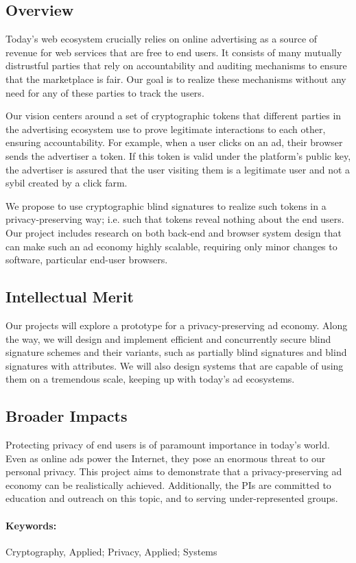 \label{sec:summary}

\subsection*{Overview}
%
Today’s web ecosystem crucially relies on online advertising as a source of revenue for web services that are free to end users.  It consists of many mutually distrustful parties that rely on accountability and auditing mechanisms to ensure that the marketplace is fair.  Our goal is to realize these mechanisms without any need for any of these parties to track the users. 

Our vision centers around a set of cryptographic tokens that different parties in the advertising ecosystem use to prove legitimate interactions to each other, ensuring accountability.  For example, when a user clicks on an ad, their browser sends the advertiser a token. If this token is valid under the platform’s public key, the advertiser is assured that the user visiting them is a legitimate user and not a sybil created by a click farm.  

We propose to use cryptographic blind signatures to realize such tokens in a privacy-preserving way; i.e. such that tokens reveal nothing about the end users.  Our project includes research on both back-end and browser system design that can make such an ad economy highly scalable, requiring only minor changes to software, particular end-user browsers. 

\subsection*{Intellectual Merit} 
Our projects will explore a prototype for a privacy-preserving ad economy.  Along the way, we will design and implement efficient and concurrently secure blind signature schemes and their variants, such as partially blind signatures and blind signatures with attributes. We will also design systems that are capable of using them on a tremendous scale, keeping up with today's ad ecosystems. 

\subsection*{Broader Impacts} 
Protecting privacy of end users is of paramount importance in today's world.  Even as online ads power the Internet, they pose an enormous threat to our personal privacy.  This project aims to demonstrate that a privacy-preserving ad economy can be realistically achieved.  Additionally, the PIs are committed to education and outreach on this topic, and to serving under-represented groups.


\paragraph{Keywords:} Cryptography, Applied; Privacy, Applied; Systems

